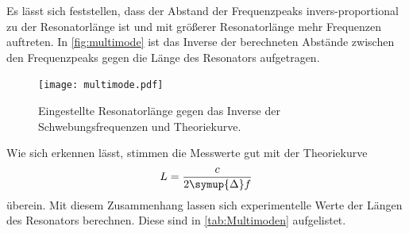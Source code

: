 Es lässt sich feststellen, dass der Abstand der Frequenzpeaks invers-proportional zu der Resonatorlänge ist und mit größerer Resonatorlänge mehr Frequenzen auftreten.
In \autoref{fig:multimode} ist das Inverse der berechneten Abstände zwischen den Frequenzpeaks gegen die Länge des Resonators aufgetragen. 
\begin{figure}[H]
  \centering
  \texttt{[image: multimode.pdf]}
  \caption{Eingestellte Resonatorlänge gegen das Inverse der Schwebungsfrequenzen und Theoriekurve.}
  \label{fig:multimode}
\end{figure}
Wie sich erkennen lässt, stimmen die Messwerte gut mit der Theoriekurve
\begin{equation}
  L = \frac{c}{2 \symup{\Delta}f}
  \label{eq:delta_f}
\end{equation}
überein. Mit diesem Zusammenhang lassen sich experimentelle Werte der Längen des Resonators berechnen. Diese sind in \autoref{tab:Multimoden} aufgelistet.

